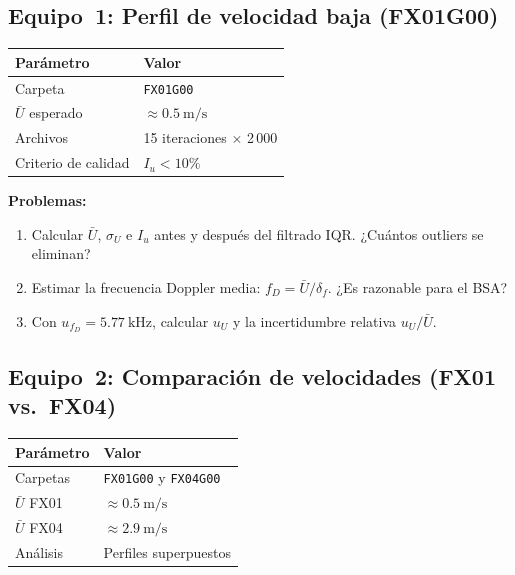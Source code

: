 \documentclass[12pt,a4paper]{article}
\begin{document}
\subsection{Equipo~1: Perfil de velocidad baja (FX01G00)}
\label{subsec:equipo1}

\begin{table}[H]
	\centering
	\begin{tabular}{ll}
		\toprule
		\textbf{Parámetro}  & \textbf{Valor}                 \\
		\midrule
		Carpeta             & \texttt{FX01G00}               \\
		$\bar{U}$ esperado  & $\approx\SI{0,5}{\m\per\s}$    \\
		Archivos            & 15 iteraciones $\times$ 2\,000 \\
		Criterio de calidad & $I_u < 10\%$                   \\
		\bottomrule
	\end{tabular}
\end{table}

\textbf{Problemas:}
\begin{enumerate}
	\item[A.1] Calcular $\bar{U}$, $\sigma_U$ e $I_u$ antes y después del
	      filtrado IQR.  ¿Cuántos outliers se eliminan?
	\item[A.2] Estimar la frecuencia Doppler media:
	      $f_D = \bar{U}/\delta_f$.  ¿Es razonable para el BSA?
	\item[A.3] Con $u_{f_D} = \SI{5,77}{\kHz}$, calcular $u_U$ y la
	      incertidumbre relativa $u_U/\bar{U}$.
\end{enumerate}

\subsection{Equipo~2: Comparación de velocidades (FX01 vs.\ FX04)}
\label{subsec:equipo2}

\begin{table}[H]
	\centering
	\begin{tabular}{ll}
		\toprule
		\textbf{Parámetro} & \textbf{Valor}                      \\
		\midrule
		Carpetas           & \texttt{FX01G00} y \texttt{FX04G00} \\
		$\bar{U}$ FX01     & $\approx\SI{0,5}{\m\per\s}$         \\
		$\bar{U}$ FX04     & $\approx\SI{2,9}{\m\per\s}$         \\
		Análisis           & Perfiles superpuestos               \\
		\bottomrule
	\end{tabular}
\end{table}
\end{document}
